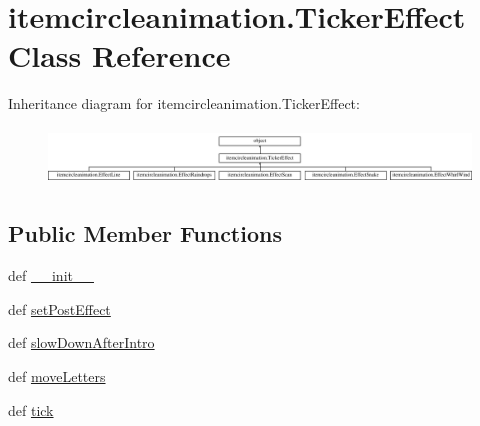 \hypertarget{classitemcircleanimation_1_1TickerEffect}{}\section{itemcircleanimation.\+Ticker\+Effect Class Reference}
\label{classitemcircleanimation_1_1TickerEffect}
Inheritance diagram for itemcircleanimation.\+Ticker\+Effect\+:\begin{figure}[H]
\begin{center}
\leavevmode
\includegraphics[height=1.520362cm]{classitemcircleanimation_1_1TickerEffect}
\end{center}
\end{figure}
\subsection*{Public Member Functions}
\begin{DoxyCompactItemize}
\item 
def \hyperlink{classitemcircleanimation_1_1TickerEffect_a5bfda30e1f5b21c67783653f8375a64a}{\+\_\+\+\_\+init\+\_\+\+\_\+}
\item 
def \hyperlink{classitemcircleanimation_1_1TickerEffect_ae4e43c9010fa10526cfde35114f6bc40}{set\+Post\+Effect}
\item 
def \hyperlink{classitemcircleanimation_1_1TickerEffect_ac922d221ed059a0d5a12f87ac851a126}{slow\+Down\+After\+Intro}
\item 
def \hyperlink{classitemcircleanimation_1_1TickerEffect_a3aeaa7645989f6a9369e4fe25a208cb8}{move\+Letters}
\item 
def \hyperlink{classitemcircleanimation_1_1TickerEffect_ab068f10bab3360b1d7703c2de95c8cac}{tick}
\end{DoxyCompactItemize}
